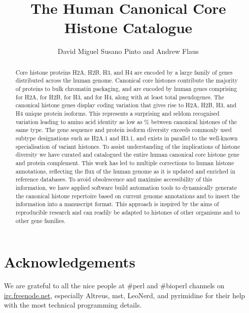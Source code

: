 \documentclass[10pt,a4paper,onecolumn,article,draft]{memoir}
\author{David Miguel Susano Pinto and Andrew Flaus}
\title{The Human Canonical Core Histone Catalogue}
\begin{document}
  \maketitle

  \begin{abstract}
    Core histone proteins H2A, H2B, H3, and H4 are encoded
    by a large family of genes distributed across the human genome.
    Canonical core histones contribute the majority of proteins to bulk
    chromatin packaging,
    and are encoded by \TotalCodingGenes{} human genes comprising
    \HTwoACodingGenes{} for H2A,
    \HTwoBCodingGenes{} for H2B,
    \HThreeCodingGenes{} for H3,
    and \HFourCodingGenes{} for H4,
    along with at least \TotalPseudoGenes{} total pseudogenes.
    The canonical histone genes display coding variation that gives rise to
    \HTwoAUniqueProteins{} H2A, \HTwoBUniqueProteins{} H2B,
    \HThreeUniqueProteins{} H3, and \HFourUniqueProteins{} H4 unique protein isoforms.
    This represents a surprising and seldom recognised variation
    leading to amino acid identity as low as 
    \FPupn{} %
    \result{}\% 
    between canonical histones of the same type.
    The gene sequence and protein isoform diversity
    exceeds commonly used subtype designations such as H2A.1 and H3.1,
    and exists in parallel to the well-known specialisation of variant histones.
    To assist understanding of the implications of histone diversity
    we have curated and catalogued the entire human canonical core
    histone gene and protein complement.
    This work has led to multiple corrections to human histone annotations,
    reflecting the flux of the human genome as it is updated and
    enriched in reference databases.
    To avoid obsolescence and maximise accessibility of this information,
    we have applied software build automation tools to
    dynamically generate the canonical histone repertoire
    based on current genome annotations and to insert the information
    into a manuscript format.
    This approach is inspired by the aims of reproducible research
    and can readily be adapted to histones of other organisms and
    to other gene families.
  \end{abstract}

  
  
  
  
  
  
  

  \section{Acknowledgements}
    We are grateful to all the nice people at \#perl and \#bioperl channels on
    \url{irc.freenode.net}, especially Altreus, mst, LeoNerd, and pyrimidine for
    their help with the most technical programming details.

  

  \newpage
  \appendix
  
\end{document}
